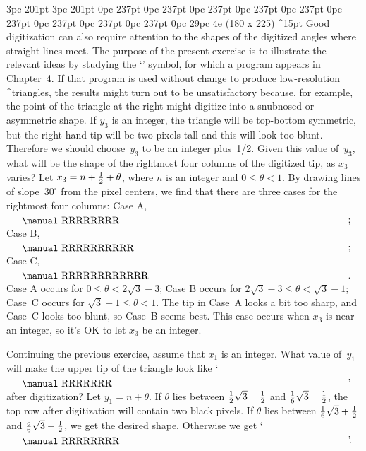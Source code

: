 \ddangerexercise
{}
3pc 201pt
3pc 201pt
0pc 237pt
0pc 237pt
0pc 237pt
0pc 237pt
0pc 237pt
0pc 237pt
0pc 237pt
0pc 237pt
0pc 237pt
0pc 29pc
\rightfig 4e ({180\apspix} x {225\apspix}) ^15pt
Good digitization can also require attention to the shapes of the
digitized angles where straight lines meet. The purpose of
the present exercise is to illustrate the relevant ideas by
studying the `' symbol, for which a program
appears in Chapter~4. If that program is used without change to produce
low-resolution ^{triangle}s, the results might turn out to be unsatisfactory
because, for example, the point of the triangle at the right
might digitize into a snubnosed or asymmetric shape.
If $y_3$ is an integer, the triangle will be top-bottom symmetric, but
the right-hand tip will be two pixels tall and this will look too blunt.
Therefore we should choose~$y_3$ to be an integer plus~1/2.
Given this value of~$y_3$, what will be the shape of the rightmost
four columns of the digitized tip, as $x_3$ varies?
\answer Let $x_3=n+{1\over2}+\theta$, where $n$ is an integer and
$0\le\theta<1$. By drawing lines of slope~$30^\circ$ from the pixel
centers, we find that there are three cases for the rightmost four
columns:
\begindisplay
Case A,
$\vcenter{\vbox{\offinterlineskip\manual
    \hbox{RR}\hbox{RRRR}\hbox{RR}\kern1pt}}$;\qquad
Case B,
$\vcenter{\vbox{\offinterlineskip\manual
    \hbox{R}\hbox{RR}\hbox{RRRR}\hbox{RR}\hbox{R}\kern1pt}}$;\qquad
Case C,
$\vcenter{\vbox{\offinterlineskip\manual
    \hbox{R}\hbox{RRR}\hbox{RRRR}\hbox{RRR}\hbox{R}\kern1pt}}$.
\enddisplay
Case A occurs for $0\le\theta<2\sqrt3-3$; Case B occurs for
$2\sqrt3-3\le\theta<\sqrt3-1$; Case~C occurs for
$\sqrt3-1\le\theta<1$. The tip in Case~A looks a bit too sharp,
and Case~C looks too blunt, so Case~B seems best. This case occurs
when $x_3$ is near an integer, so it's OK to let $x_3$ be an integer.

\ddangerexercise Continuing the previous exercise, assume that $x_1$
is an integer. What value of~$y_1$ will make the upper tip of the
triangle look like
`\thinspace$\vcenter{\vbox{\offinterlineskip\manual
    \hbox{R}\hbox{RR}\hbox{RRRR}\kern1pt}}$' after digitization?
\answer Let $y_1=n+\theta$. If $\theta$ lies between
${1\over2}\sqrt3-{1\over2}$ and ${1\over6}\sqrt3+{1\over2}$,
the top row after digitization will contain two black pixels.
If $\theta$ lies between ${1\over6}\sqrt3+{1\over2}$ and
${5\over6}\sqrt3-{1\over2}$, we get the desired shape. Otherwise
we get `\thinspace$\vcenter{\vbox{\offinterlineskip\manual
    \hbox{R}\hbox{RRR}\hbox{RRRR}\kern1pt}}$'.

